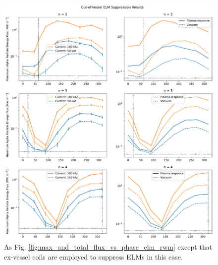 \documentclass[10pt, a4paper, twoside]{article}
\begin{document}
\begin{figure}[!htb]
    \centering
    \includegraphics[width=0.99\linewidth]{Figures/max_and_total_flux_vs_phase_exterior_rmp.pdf}
    \caption{As Fig. \ref{fig:max_and_total_flux_vs_phase_elm_rwm} except that ex-vessel coils are employed to suppress ELMs in this case.}
    \label{fig:max_and_total_flux_vs_phase_elm}
\end{figure}

\end{document}
